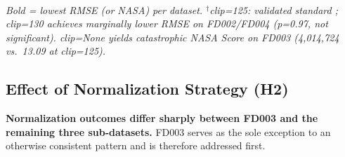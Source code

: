 \documentclass[review,12pt]{elsarticle}
\begin{document}
\begin{table}[!t]
\centering
\footnotesize
\caption{RUL clipping threshold comparison (H1): mean RMSE and NASA prognostic score across five clipping thresholds on four CMAPSS sub-datasets (linear regression (OLS), one deterministic run per configuration; 20 configurations total).}
\label{tab:iv}
\\[3pt]
\begin{minipage}{\linewidth}
\footnotesize\textit{Bold = lowest RMSE (or NASA) per dataset. $^\dagger$clip=125: validated standard \cite{ref05,ref06}; clip=130 achieves marginally lower RMSE on FD002/FD004 (p=0.97, not significant). clip=None yields catastrophic NASA Score on FD003 (4,014,724 vs.\ 13.09 at clip=125).}
\end{minipage}
\end{table}


\subsection{Effect of Normalization Strategy (H2)}

\textbf{Normalization outcomes differ sharply between FD003 and the remaining three sub-datasets.} FD003 serves as the sole exception to an otherwise consistent pattern and is therefore addressed first.
\end{document}
